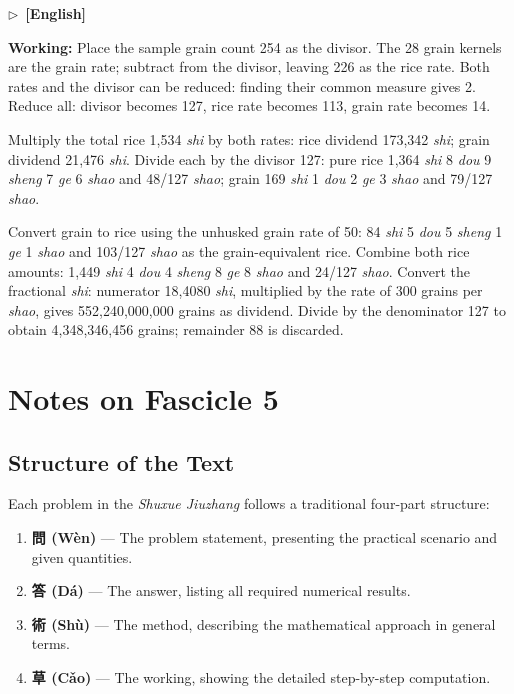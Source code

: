 \documentclass[10pt,a4paper]{article}
\newcommand{\ENmarker}{\noindent\textcolor{enlabel}{$\triangleright$\ \textbf{[English]}}\par}
\newcommand{\WorkingEn}[1]{\par\noindent\textbf{\color{workingcolor}Working:} #1\par}
\begin{document}
\ENmarker
\WorkingEn{Place the sample grain count 254 as the divisor. The 28 grain kernels are the grain rate; subtract from the divisor, leaving 226 as the rice rate. Both rates and the divisor can be reduced: finding their common measure gives 2. Reduce all: divisor becomes 127, rice rate becomes 113, grain rate becomes 14.

Multiply the total rice 1,534 \textit{shi} by both rates: rice dividend 173,342 \textit{shi}; grain dividend 21,476 \textit{shi}. Divide each by the divisor 127: pure rice 1,364 \textit{shi} 8 \textit{dou} 9 \textit{sheng} 7 \textit{ge} 6 \textit{shao} and 48/127 \textit{shao}; grain 169 \textit{shi} 1 \textit{dou} 2 \textit{ge} 3 \textit{shao} and 79/127 \textit{shao}.

Convert grain to rice using the unhusked grain rate of 50: 84 \textit{shi} 5 \textit{dou} 5 \textit{sheng} 1 \textit{ge} 1 \textit{shao} and 103/127 \textit{shao} as the grain-equivalent rice. Combine both rice amounts: 1,449 \textit{shi} 4 \textit{dou} 4 \textit{sheng} 8 \textit{ge} 8 \textit{shao} and 24/127 \textit{shao}. Convert the fractional \textit{shi}: numerator 18,4080 \textit{shi}, multiplied by the rate of 300 grains per \textit{shao}, gives 552,240,000,000 grains as dividend. Divide by the denominator 127 to obtain 4,348,346,456 grains; remainder 88 is discarded.}


\newpage
\section*{Notes on Fascicle 5}

\subsection*{Structure of the Text}

Each problem in the \textit{Shuxue Jiuzhang} follows a traditional four-part structure:

\begin{enumerate}
    \item \textbf{問 (W\`{e}n)} --- The problem statement, presenting the practical scenario and given quantities.
    \item \textbf{答 (D\'{a})} --- The answer, listing all required numerical results.
    \item \textbf{術 (Sh\`{u})} --- The method, describing the mathematical approach in general terms.
    \item \textbf{草 (C\v{a}o)} --- The working, showing the detailed step-by-step computation.
\end{enumerate}
\end{document}
